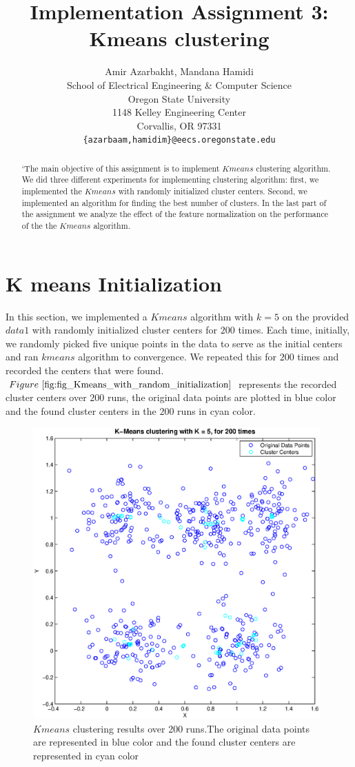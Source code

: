\documentclass{article} %
\title{\Large{\textbf{ Implementation  Assignment 3: Kmeans clustering }}}
\author{
Amir Azarbakht, Mandana Hamidi\\
\small School of Electrical Engineering \& Computer Science\\ 
\small Oregon State University\\
\small 1148 Kelley Engineering Center\\
\small Corvallis, OR 97331\\
\small\texttt{\{azarbaam,hamidim\}@eecs.oregonstate.edu}
}
\date{}
\begin{document}
\maketitle


\begin{abstract}
`The main objective of this assignment is to implement $Kmeans$ clustering algorithm. We did three different experiments for implementing clustering algorithm: first, we implemented the $Kmeans$ with randomly initialized cluster centers. Second, we implemented an algorithm for finding the best number of clusters. In the last part of the assignment we analyze the effect of the feature normalization on the performance of the the $Kmeans$ algorithm.
\end{abstract}

\section{K means Initialization }
In this section, we implemented  a $Kmeans$ algorithm with $k = 5$ on the provided $data1$ with randomly initialized cluster centers for $200$ times. Each time, initially, we randomly picked five unique points in the data to serve as the initial centers and ran $kmeans$ algorithm to convergence. We repeated this for $200$ times and recorded the centers that were found.\\
$Figure~\ref{fig:fig_Kmeans_with_random_initialization}$  represents the recorded cluster centers over $200$ runs, the original data points are plotted in blue color and the found cluster centers in the $200$ runs in cyan color.\\

\begin{figure}[h]
\begin{center}
\includegraphics[width=11cm]{Fig/fig_Kmeans_with_random_initialization.eps}
\end{center}
\caption{\small{$Kmeans$ clustering results over 200 runs.The original data points are represented in blue color and the found cluster centers are represented in cyan color}}
\label{fig:fig_Kmeans_with_random_initialization}
\end{figure}
\end{document}
